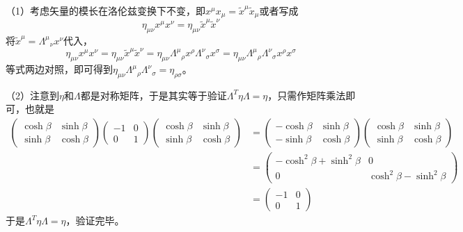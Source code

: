 \begin{solution}
	（1）考虑矢量的模长在洛伦兹变换下不变，即\(x^\mu x_\mu= \tilde{x}^\mu \tilde{x}_\mu\)或者写成
	\[\eta_{\mu\nu}x^\mu x^\nu=\eta_{\mu\nu}\tilde{x}^\mu \tilde{x}^\nu\]
	将\(\tilde{x}^\mu={\Lambda^\mu}_\nu x^\nu\)代入，
	\[\eta_{\mu\nu}x^\mu x^\nu=\eta_{\mu\nu}\tilde{x}^\mu \tilde{x}^\nu=\eta_{\mu\nu}{\Lambda^\mu}_\rho x^\rho {\Lambda^\nu}_\sigma x^\sigma=\eta_{\mu\nu}{\Lambda^\mu}_{\rho}{\Lambda^\nu}_{\sigma} x^\rho x^\sigma\]
	等式两边对照，即可得到\(\eta_{\mu\nu}{\Lambda^\mu}_{\rho}{\Lambda^\nu}_{\sigma}=\eta_{\rho\sigma}\)。
	
	（2）注意到\(\eta\)和\(\Lambda\)都是对称矩阵，于是其实等于验证\(\Lambda^T \eta \Lambda=\eta\)，只需作矩阵乘法即可，也就是
	\begin{align*}
		\begin{pmatrix}\cosh{\beta} & \sinh{\beta}\\ \sinh{\beta} & \cosh{\beta}  \end{pmatrix}
		\begin{pmatrix}-1 & 0\\ 0 & 1  \end{pmatrix}
		\begin{pmatrix}\cosh{\beta} & \sinh{\beta}\\ \sinh{\beta} & \cosh{\beta}  \end{pmatrix}
		&=
		\begin{pmatrix}-\cosh{\beta} & \sinh{\beta}\\ -\sinh{\beta} & \cosh{\beta}  \end{pmatrix}
		\begin{pmatrix}\cosh{\beta} & \sinh{\beta}\\ \sinh{\beta} & \cosh{\beta}  \end{pmatrix}\\
		&=
		\begin{pmatrix}-\cosh^2{\beta}+\sinh^2{\beta} & 0\\ 0 & \cosh^2{\beta}-\sinh^2{\beta}  \end{pmatrix}\\
		&=
		\begin{pmatrix}-1 & 0\\ 0 & 1  \end{pmatrix}
	\end{align*}
	于是\(\Lambda^T \eta \Lambda=\eta\)，验证完毕。
\end{solution}

	
